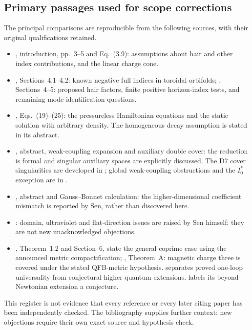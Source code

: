 \subsection{Primary passages used for scope corrections}
The principal comparisons are reproducible from the following sources, with their original qualifications retained.
\begin{itemize}[leftmargin=1.4em,itemsep=2pt]
\item \cite{Sen11positivity}, introduction, pp.~3--5 and Eq.~(3.9): assumptions about hair and other index contributions, and the linear charge cone.
\item \cite{CD19}, Sections~4.1--4.2: known negative full indices in toroidal orbifolds; \cite{CD21}, Sections~4--5: proposed hair factors, finite positive horizon-index tests, and remaining mode-identification questions.
\item \cite{Sen02field}, Eqs.~(19)--(25): the pressureless Hamiltonian equations and the static solution with arbitrary density. The homogeneous decay assumption is stated in its abstract.
\item \cite{Sen97orientifold}, abstract, weak-coupling expansion and auxiliary double cover: the reduction is formal and singular auxiliary spaces are explicitly discussed. The D7 cover singularities are developed in \cite{CDE09}; global weak-coupling obstructions and the $I_0^*$ exception are in \cite{HLS18}.
\item \cite{Sen05stretching}, abstract and Gauss--Bonnet calculation: the higher-dimensional coefficient mismatch is reported by Sen, rather than discovered here.
\item \cite{Sen23localisation}: domain, ultraviolet and flat-direction issues are raised by Sen himself; they are not new unacknowledged objections.
\item \cite{FKS18}, Theorem~1.2 and Section~6, state the general coprime case using the announced metric compactification; \cite{KottkeRochon24}, Theorem~A: magnetic charge three is covered under the stated QFB-metric hypothesis. \cite{KrishnaSahoo23} separates proved one-loop universality from conjectural higher quantum extensions. \cite{KKMSS26} labels its beyond-Newtonian extension a conjecture.
\end{itemize}
This register is not evidence that every reference or every later citing paper has been independently checked. The bibliography supplies further context; new objections require their own exact source and hypothesis check.
